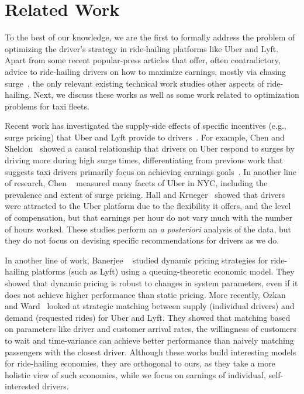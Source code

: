 
\section{Related Work}
\label{sec:related_work}

To the best of our knowledge, we are the first to formally address the problem of optimizing
the driver's strategy in ride-hailing platforms like Uber and Lyft. 
Apart from 
some recent popular-press articles that 
offer, often contradictory, advice to ride-hailing drivers on how to maximize earnings, mostly via chasing surge~\cite{dont,tips}, 
the only relevant existing technical work 
studies other aspects of ride-hailing. 
Next, we discuss these works as well as some work related to optimization problems
for taxi fleets.


Recent work has investigated the supply-side effects of specific incentives (e.g., surge pricing) that Uber and Lyft provide to drivers~\cite{slaves}.  For example, Chen and Sheldon~\cite{chen2016dynamic} showed a causal relationship that drivers on Uber respond to surges by driving more during high surge times,  differentiating from previous work that suggests taxi drivers primarily focus on achieving earnings goals~\cite{camerer1997labor}. 
In another line of research,
Chen {\etal}~\cite{chen2015peeking} measured many facets of Uber in NYC, including the prevalence and extent 
  of surge pricing.
Hall and Krueger~\cite{hall2016analysis} showed that drivers were attracted to the Uber platform due to the flexibility it offers, 
and the level of compensation, but that earnings per hour do not vary much with the number of hours worked. 
These studies perform an {\em a posteriori} analysis of the data,
but they do not focus on devising specific recommendations for drivers as we do.


 In another line of work, Banerjee {\etal}~\cite{banerjee2015pricing} studied  
 dynamic
pricing strategies for ride-hailing platforms (such as Lyft) using a 
queuing-theoretic economic model. 
They showed that dynamic pricing is robust to changes in system parameters, even if it does not 
  achieve higher performance than static pricing.  
More recently, Ozkan and Ward~\cite{ozkan2016dynamic} looked at strategic matching between supply (individual drivers) 
  and demand (requested rides) for Uber and Lyft.
They showed that matching based on parameters like driver and customer arrival rates,  the willingness of customers to wait and time-variance can achieve better performance than naively matching 
passengers with the closest driver. 
Although these works build interesting models for ride-hailing economies, they are
orthogonal to ours, as they take a more holistic view of such economies, while we focus 
 on earnings of individual, self-interested drivers.





